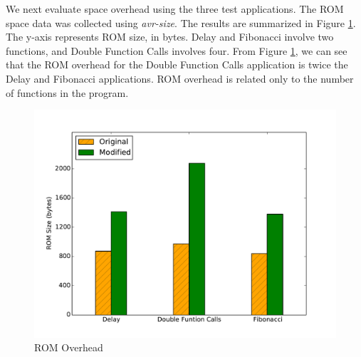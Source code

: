We next evaluate space overhead using the three test applications. The ROM space data was collected using \textit{avr-size}. The results are summarized in Figure \ref{fig:space_overhead}. The y-axis represents ROM size, in bytes. Delay and Fibonacci involve two functions, and Double Function Calls involves four. From Figure \ref{fig:space_overhead}, we can see that the ROM overhead for the Double Function Calls application is twice the Delay and Fibonacci applications. ROM overhead is related only to the number of functions in the program.

\begin{figure}[h]
\centering
\includegraphics[scale=0.47]{figures/space_overhead.pdf}
\caption{ROM Overhead}
\vspace{5pt}
\label{fig:space_overhead}
\end{figure}

